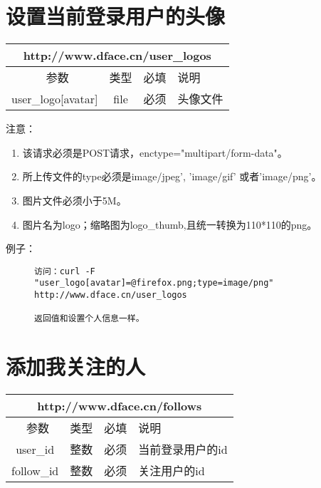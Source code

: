\documentclass[cs4size]{ctexartutf8}
\begin{document}
\section{设置当前登录用户的头像}

\begin{table}[H]
   \begin{center}
\begin{tabular}{|c|c|c|p{12cm}|}
\hline
\multicolumn{4}{|c|}{http://www.dface.cn/user\_logos} \\
\hline\hline
 \  参数  & 类型 & 必填 &  说明  \\
\hline
 user\_logo[avatar]  & file & 必须 &  头像文件\\
\hline
\end{tabular}
   \end{center}
\end{table}

注意：

\begin{enumerate}
\item 该请求必须是POST请求，enctype="multipart/form-data"。
\item 所上传文件的type必须是image/jpeg', 'image/gif' 或者'image/png'。
\item 图片文件必须小于5M。
\item 图片名为logo；缩略图为logo\_thumb,且统一转换为110*110的png。
\end{enumerate}

例子：

\begin{figure}[H]
\begin{verbatim}
访问：curl -F "user_logo[avatar]=@firefox.png;type=image/png" 
http://www.dface.cn/user_logos

返回值和设置个人信息一样。

\end{verbatim}
\end{figure}





\section{添加我关注的人}

\begin{table}[H]
   \begin{center}
\begin{tabular}{|c|c|c|p{12cm}|}
\hline
\multicolumn{4}{|c|}{http://www.dface.cn/follows} \\
\hline\hline
 \  参数  & 类型 & 必填 &  说明  \\
\hline
 user\_id  & 整数 & 必须 &  当前登录用户的id\\
\hline
 follow\_id  & 整数 & 必须 &  关注用户的id\\
\hline
\end{tabular}
   \end{center}
\end{table}
\end{document}
